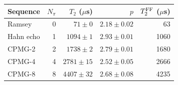 \begin{tabular}{lrrrr}
\hline
\textbf{Sequence} & \textbf{$N_\pi$} & \textbf{$T_2$ ($\mu$s)} & \textbf{$p$} & \textbf{$T_2^{\rm FF}$ ($\mu$s)}\\
\hline
Ramsey & 0 & $71 \pm 0$ & $2.18 \pm 0.02$ & 63\\
Hahn echo & 1 & $1094 \pm 1$ & $2.93 \pm 0.01$ & 1060\\
CPMG-2 & 2 & $1738 \pm 2$ & $2.79 \pm 0.01$ & 1680\\
CPMG-4 & 4 & $2781 \pm 15$ & $2.52 \pm 0.05$ & 2666\\
CPMG-8 & 8 & $4407 \pm 32$ & $2.68 \pm 0.08$ & 4235\\
\hline
\end{tabular}

